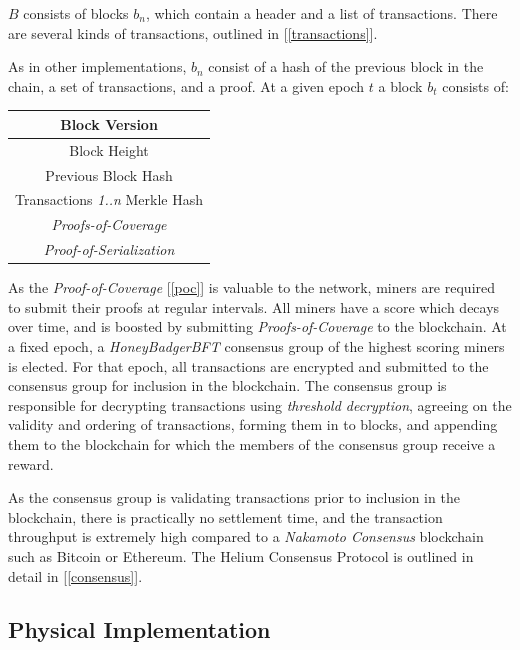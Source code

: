 \documentclass[UTF8, 10pt, nonatbib, nocopyrightspace, reprint]{sigplanconf}
\newcommand{\secref}[1]{[\autoref{#1}]}
\begin{document}
$B$ consists of blocks $b_n$, which contain a header and a list of transactions. There are several kinds of transactions, outlined in \secref{transactions}. 

As in other implementations, $b_n$ consist of a hash of the previous block in the chain, a set of transactions, and a proof. At a given epoch $t$ a block $b_t$ consists of:

\begin{center}
    \begin{tabular}{|c|}
         \hline
         Block Version \\
         \hline
         Block Height \\
         \hline
         Previous Block Hash \\
         \hline
         Transactions \emph{1..n} Merkle Hash \\
         \hline
         \emph{Proofs-of-Coverage} \\
         \hline
         \emph{Proof-of-Serialization} \\
         \hline
    \end{tabular}
\end{center}

As the \emph{Proof-of-Coverage} \secref{poc} is valuable to the network, miners are required to submit their proofs at regular intervals. All miners have a score which decays over time, and is boosted by submitting \emph{Proofs-of-Coverage} to the blockchain. At a fixed epoch, a \emph{HoneyBadgerBFT} \cite{honeybadger} consensus group of the highest scoring miners is elected. For that epoch, all transactions are encrypted and submitted to the consensus group for inclusion in the blockchain. The consensus group is responsible for decrypting transactions using \emph{threshold decryption}, agreeing on the validity and ordering of transactions, forming them in to blocks, and appending them to the blockchain for which the members of the consensus group receive a reward.

As the consensus group is validating transactions prior to inclusion in the blockchain, there is practically no settlement time, and the transaction throughput is extremely high compared to a \emph{Nakamoto Consensus} blockchain such as Bitcoin or Ethereum. The Helium Consensus Protocol is outlined in detail in \secref{consensus}.

\subsection{Physical Implementation}
\end{document}

